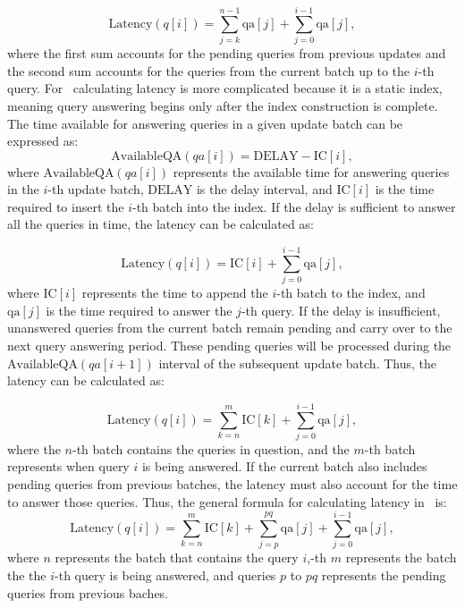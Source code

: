 \begin{equation}
\text{Latency}(q[i]) = \sum_{j=k}^{n-1} \text{qa}[j] + \sum_{j=0}^{i-1} \text{qa}[j],
\end{equation}
% 
where the first sum accounts for the pending queries from previous updates
and the second sum accounts for the queries from the current batch up to the $i$-th query.
%
For \Fresh\, calculating latency is more complicated because it is a static index, meaning 
query answering begins only after the index construction is complete. The time available 
for answering queries in a given update batch can be expressed as:
\begin{equation}
\text{AvailableQA}(qa[i]) = \text{DELAY} - \text{IC}[i],
\end{equation}
% 
where $\text{AvailableQA}(qa[i])$ represents the available time for answering queries 
in the $i$-th update batch, $\text{DELAY}$ is the delay interval, and $\text{IC}[i]$ 
is the time required to insert the $i$-th batch into the index.
% 
If the delay is sufficient to answer all the queries in time, the latency can be calculated as:

\begin{equation}
\text{Latency}(q[i]) = \text{IC}[i] + \sum_{j=0}^{i-1} \text{qa}[j],
\end{equation}
% 
where $\text{IC}[i]$ represents the time to append the $i$-th batch to the index, and 
$\text{qa}[j]$ is the time required to answer the $j$-th query. If the delay is insufficient, 
unanswered queries from the current batch remain pending and carry over to the next query 
answering period. These pending queries will be processed during the 
$\text{AvailableQA}(qa[i+1])$ interval of the subsequent update batch. 
Thus, the latency can be calculated as:

\begin{equation}
\text{Latency}(q[i]) = \sum_{k=n}^{m} \text{IC}[k] + \sum_{j=0}^{i-1} \text{qa}[j],
\end{equation}
% 
where the $n$-th batch contains the queries in question, and the $m$-th batch represents 
when query $i$ is being answered. If the current batch also includes pending queries from 
previous batches, the latency must also account for the time to answer those queries. 
Thus, the general formula for calculating latency in \Fresh\ is:
% 
\begin{equation}
\text{Latency}(q[i]) = \sum_{k=n}^{m} \text{IC}[k] + \sum_{j=p}^{pq} \text{qa}[j] + \sum_{j=0}^{i-1} \text{qa}[j],
\end{equation}
% 
where $n$ represents the batch that contains the query $i$,-th 
$m$ represents the batch the the $i$-th query is being answered, 
and queries $p$ to $pq$ represents the pending queries from previous baches.


